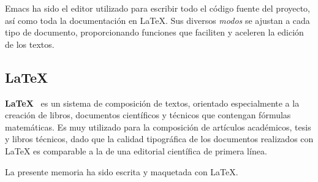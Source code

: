 Emacs ha sido el editor utilizado para escribir todo el código fuente del
proyecto, así como toda la documentación en \LaTeX. Sus diversos \textit{modos}
se ajustan a cada tipo de documento, proporcionando funciones que faciliten y
aceleren la edición de los textos.

\subsection{\LaTeX}
\textbf{\LaTeX}~\cite{latex} es un sistema de composición de textos, orientado especialmente
a la creación de libros, documentos científicos y técnicos que contengan
fórmulas matemáticas. Es muy utilizado para la composición de artículos
académicos, tesis y libros técnicos, dado que la calidad tipográfica de los
documentos realizados con LaTeX es comparable a la de una editorial científica
de primera línea.

La presente memoria ha sido escrita y maquetada con \LaTeX.
